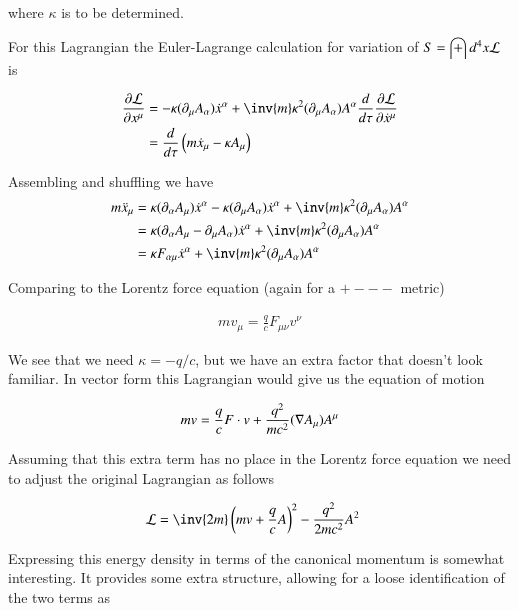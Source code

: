 \documentclass{article}
\begin{document}
where $\kappa$ is to be determined.

For this Lagrangian the Euler-Lagrange calculation for variation of $S = \int d^4 x \mathcal{L}$ is

\begin{align*}
\PD{x^\mu}{\LL}
&= - \kappa (\partial_\mu A_\alpha) \xdot^\alpha + \inv{m} \kappa^2 (\partial_\mu A_\alpha) A^\alpha
\frac{d}{d\tau} \PD{\xdot^\mu}{\LL} \\
&= \frac{d}{d\tau} \left(m \xdot_\mu - \kappa A_\mu \right)
\end{align*}

Assembling and shuffling we have
\begin{align*}
m \xddot_\mu
&= \kappa (\partial_\alpha A_\mu) \xdot^\alpha
- \kappa (\partial_\mu A_\alpha) \xdot^\alpha + \inv{m} \kappa^2 (\partial_\mu A_\alpha) A^\alpha \\
&= \kappa (\partial_\alpha A_\mu - \partial_\mu A_\alpha) \xdot^\alpha + \inv{m} \kappa^2 (\partial_\mu A_\alpha) A^\alpha \\
&= \kappa F_{\alpha\mu} \xdot^\alpha + \inv{m} \kappa^2 (\partial_\mu A_\alpha) A^\alpha \\
\end{align*}

Comparing to the Lorentz force equation (again for a $+---$ metric)

\begin{align*}
m v_\mu = \frac{q}{c} F_{\mu\nu} v^\nu
\end{align*}

We see that we need $\kappa = -q/c$, but we have an extra factor that doesn't look familiar.  In vector form this Lagrangian would give us the
equation of motion

\begin{align*}
m v = \frac{q}{c} F \cdot v + \frac{q^2}{m c^2} (\nabla A_\mu) A^\mu
\end{align*}

Assuming that this extra term has no place in the Lorentz force equation we need to adjust the original Lagrangian as follows

\begin{align}
\LL
&= \inv{2 m}\left( m v + \frac{q}{c} A \right)^2 - \frac{q^2}{ 2 m c^2} A^2
\end{align}

Expressing this energy density in terms of the canonical momentum is 
somewhat interesting.  It provides some extra structure, allowing for a loose identification of the two terms as
\end{document}

